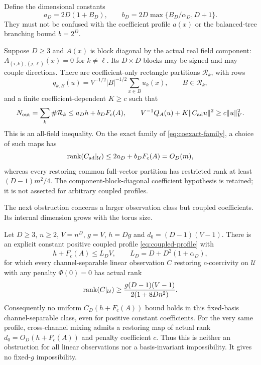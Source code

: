 Define the dimensional constants
\begin{equation}\label{eq:adapt-constants}
 a_D=2D(1+B_D),\qquad b_D=2D\max\{B_D/\alpha_D,D+1\}.
\end{equation}
They must not be confused with the coefficient profile $a(x)$ or the
balanced-tree branching bound $b=2^D$.

\begin{theorem}\label{thm:adapted}
Suppose $D\ge3$ and $A(x)$ is block diagonal by the actual real field
component: $A_{(i,k),(j,\ell)}(x)=0$ for $k\ne\ell$. Its $D\times D$
blocks may be signed and may couple directions. There are coefficient-only
rectangle partitions $\mathcal R_k$, with rows
\[
 q_{k,B}(u)=V^{-1/2}|B|^{-1/2}\sum_{x\in B}u_k(x),
 \qquad B\in\mathcal R_k,
\]
and a finite coefficient-dependent $K\ge c$ such that
\begin{equation}\label{eq:adapted-bound}
 N_{\rm out}=\sum_k\#\mathcal R_k\le a_Dh+b_DF_c(A),\qquad
 V^{-1}Q_A(u)+K\|C_{\rm ad}u\|^2\ge c\|u\|_{V}^2.
\end{equation}
This is an all-field inequality. On the exact family of
\eqref{eq:coexact-family}, a choice of such maps has
\begin{equation}\label{eq:adapted-escape}
 \operatorname{rank}(C_{\rm ad}|_{\mathcal U})\le2a_D+b_DF_c(A)=O_D(m),
\end{equation}
whereas every restoring common full-vector partition has restricted rank
at least $(D-1)m^2/4$. The component-block-diagonal coefficient hypothesis
is retained; it is not asserted for arbitrary coupled profiles.
\end{theorem}

The next obstruction concerns a larger observation class but coupled
coefficients. Its internal dimension grows with the torus size.
\begin{theorem}\label{thm:separable}
Let $D\ge3$, $n\ge2$, $V=n^D$, $g=V$, $h=Dg$ and
$d_0=(D-1)(V-1)$. There is an explicit constant positive coupled profile
\eqref{eq:coupled-profile} with
\[
 h+F_c(A)\le L_DV,\qquad L_D=D+D^2(1+\alpha_D),
\]
for which every channel-separable linear observation $C$ restoring
$c$-coercivity on $\mathcal U$ with any penalty $\Phi(0)=0$ has actual rank
\begin{equation}\label{eq:separable-lower}
 \operatorname{rank}(C|_{\mathcal U})\ge
 \frac{g(D-1)(V-1)}{2(1+8Dn^2)}.
\end{equation}
Consequently no uniform $C_D(h+F_c(A))$ bound holds in this fixed-basis
channel-separable class, even for positive constant coefficients.
For the very same profile, cross-channel mixing admits a restoring map
of actual rank $d_0=O_D(h+F_c(A))$ and penalty coefficient $c$.
Thus this is neither an obstruction for all linear observations nor a
basis-invariant impossibility. It gives no fixed-$g$ impossibility.
\end{theorem}

